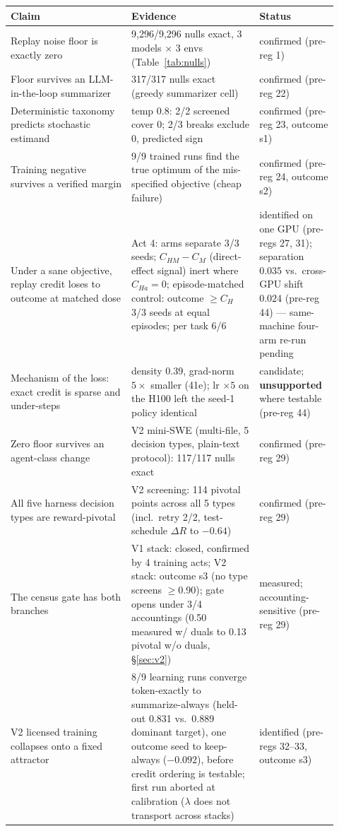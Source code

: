 \documentclass{article}
\theoremstyle{remark}
\begin{document}
\begin{table}[h]
\centering\scriptsize
\begin{tabular}{p{0.34\linewidth}p{0.36\linewidth}p{0.22\linewidth}}
\toprule
Claim & Evidence & Status \\
\midrule
Replay noise floor is exactly zero & 9{,}296/9{,}296 nulls exact, 3 models $\times$ 3 envs (Table~\ref{tab:nulls}) & confirmed (pre-reg 1) \\
Floor survives an LLM-in-the-loop summarizer & 317/317 nulls exact (greedy summarizer cell) & confirmed (pre-reg 22) \\
Deterministic taxonomy predicts stochastic estimand & temp $0.8$: 2/2 screened cover 0; 2/3 breaks exclude 0, predicted sign & confirmed (pre-reg 23, outcome s1) \\
Training negative survives a verified margin & 9/9 trained runs find the true optimum of the mis-specified objective (cheap failure) & confirmed (pre-reg 24, outcome s2) \\
Under a sane objective, replay credit loses to outcome at matched dose & Act 4: arms separate 3/3 seeds; $C_{HM}-C_M$ (direct-effect signal) inert where $C_{Ha}=0$; episode-matched control: outcome $\geq C_H$ 3/3 seeds at equal episodes; per task 6/6 & identified on one GPU (pre-regs 27, 31); separation $0.035$ vs.\ cross-GPU shift $0.024$ (pre-reg 44) --- same-machine four-arm re-run pending \\
Mechanism of the loss: exact credit is sparse and under-steps & density 0.39, grad-norm $5\times$ smaller (41e); lr $\times 5$ on the H100 left the seed-1 policy identical & candidate; \textbf{unsupported} where testable (pre-reg 44) \\
Zero floor survives an agent-class change & V2 mini-SWE (multi-file, 5 decision types, plain-text protocol): 117/117 nulls exact & confirmed (pre-reg 29) \\
All five harness decision types are reward-pivotal & V2 screening: 114 pivotal points across all 5 types (incl.\ retry 2/2, test-schedule $\Delta R$ to $-0.64$) & confirmed (pre-reg 29) \\
The census gate has both branches & V1 stack: closed, confirmed by 4 training acts; V2 stack: outcome s3 (no type screens $\geq$0.90); gate opens under 3/4 accountings (0.50 measured w/ duals to 0.13 pivotal w/o duals, \S\ref{sec:v2}) & measured; accounting-sensitive (pre-reg 29) \\
V2 licensed training collapses onto a fixed attractor & 8/9 learning runs converge token-exactly to summarize-always (held-out 0.831 vs.\ 0.889 dominant target), one outcome seed to keep-always ($-0.092$), before credit ordering is testable; first run aborted at calibration ($\lambda$ does not transport across stacks) & identified (pre-regs 32--33, outcome s3) \\

\end{tabular}
\end{table}
\end{document}
